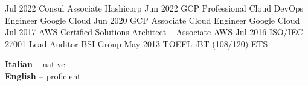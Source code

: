 \documentclass[9pt]{developercv}
\begin{document}

\begin{entrylist}
	\entryCert
		{Jul 2022}
		{Consul Associate}
		{Hashicorp}
	\entryCert
		{Jun 2022}
		{GCP Professional Cloud DevOps Engineer}
		{Google Cloud}
	\entryCert
		{Jun 2020}
		{GCP Associate Cloud Engineer}
		{Google Cloud}
	\entryCert
		{Jul 2017}
		{AWS Certified Solutions Architect -- Associate}
		{AWS}
	\entryCert
		{Jul 2016}
		{ISO/IEC 27001 Lead Auditor}
		{BSI Group}
	\entryCert
		{May 2013}
		{TOEFL iBT (108/120)}
		{ETS}
\end{entrylist}

\begin{minipage}[t]{1\textwidth}
	\vspace{-\baselineskip}

	
	\textbf{Italian} -- native\\
	\textbf{English} -- proficient
\end{minipage}
\end{document}
